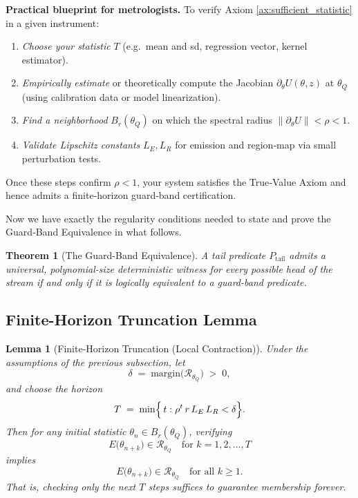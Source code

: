 \documentclass[12pt]{article}
\theoremstyle{definition}
\theoremstyle{plain}
\newtheorem{theorem}{Theorem}[section]
\newtheorem{lemma}{Lemma}[section]
\begin{document}
\medskip\noindent
\textbf{Practical blueprint for metrologists.}
To verify Axiom \ref{ax:sufficient_statistic} in a given instrument:
\begin{enumerate}[nosep]
  \item \emph{Choose your statistic} \(T\) (e.g.\ mean and sd, regression vector, kernel estimator).  
  \item \emph{Empirically estimate} or theoretically compute the Jacobian \(\partial_\theta U(\theta,z)\) at \(\theta_Q\) (using calibration data or model linearization).  
  \item \emph{Find a neighborhood} \(B_r(\theta_Q)\) on which the spectral radius \(\|\partial_\theta U\|<\rho<1\).  
  \item \emph{Validate Lipschitz constants} \(L_E,L_R\) for emission and region‐map via small perturbation tests.  
\end{enumerate}
Once these steps confirm \(\rho<1\), your system satisfies the True‐Value Axiom and hence admits a finite‐horizon guard‐band certification.


Now we have exactly the regularity conditions needed to state and prove the Guard‑Band Equivalence in what follows.


\begin{theorem}[The Guard-Band Equivalence]
A tail predicate $P_{\mathrm{tail}}$ admits a universal, polynomial-size deterministic witness for every possible head of the stream if and only if it is logically equivalent to a guard-band predicate.
\end{theorem}


\subsection{Finite-Horizon Truncation Lemma}
\label{lem:finite_horizon_local}

\begin{lemma}[Finite‐Horizon Truncation (Local Contraction)]
Under the assumptions of the previous subsection, let
\[
  \delta \;=\; \text{margin}\bigl(\mathcal R_{\theta_Q}\bigr)
  \;>\;0,
\]
and choose the horizon
\[
  T \;=\;\min\Bigl\{\,t : \rho^t\,r\,L_E\,L_R < \delta\Bigr\}.
\]
Then for any initial statistic $\theta_n\in B_r(\theta_Q)$, verifying
\[
  E\bigl(\theta_{n+k}\bigr)\in\mathcal R_{\theta_Q}
  \quad\text{for }k=1,2,\dots,T
\]
implies
\[
  E\bigl(\theta_{n+k}\bigr)\in\mathcal R_{\theta_Q}
  \quad\text{for all }k\ge1.
\]
That is, checking only the next $T$ steps suffices to guarantee membership forever.
\end{lemma}
\end{document}
